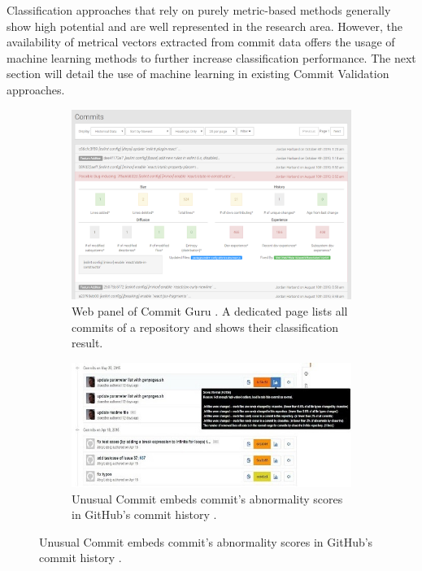 Classification approaches that rely on purely metric-based methods generally show high potential and are well represented in the research area. However, the availability of metrical vectors extracted from commit data offers the usage of machine learning methods to further increase classification performance. The next section will detail the use of machine learning in existing Commit Validation approaches.%

\begin{figure}[p!]
	\centering
	
	\begin{subfigure}[t]{\textwidth}
		\centering
		\includegraphics[width=.75\textwidth]{images/ui/commitguru/screenshot-repo-js-commits-buggy-smaller}
		\caption{Web panel of Commit Guru \cite{Rosen2015}. A dedicated page lists all commits of a repository and shows their classification result.}
		\label{fig:ui-commitguru}
	\end{subfigure}
	
	\begin{subfigure}[t]{.75\textwidth}
		\includegraphics[width=\textwidth]{images/ui/unusualcommits/github-integration2-smaller}
		\caption{Unusual Commit embeds commit's abnormality scores in GitHub's commit history \cite{Goyal2017}.}
		\label{fig:ui-unusualcommits-history}
	\end{subfigure}
	

\end{figure}
